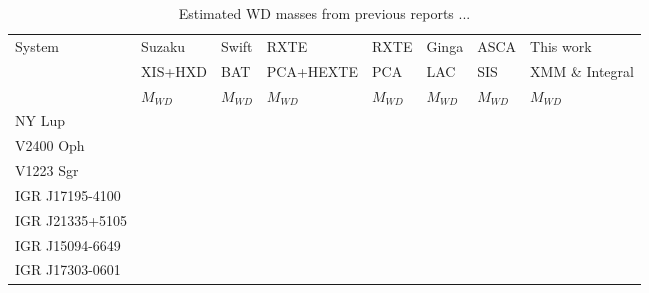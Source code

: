 \documentclass[oneside,a4paper,11pt]{report}
\begin{document}
\begin{table}
\begin{center}
 

\caption{Estimated WD masses from previous reports ...}
\begin{tabular}{llllllll}
\hline
\hline
System & Suzaku & Swift & RXTE & RXTE & Ginga & ASCA& This work  \\
       & XIS+HXD & BAT& PCA+HEXTE & PCA & LAC & SIS & XMM \& Integral                     \\
       & $M_{WD}$ &$M_{WD}$ &$M_{WD} $&$M_{WD}$ &$M_{WD}$ &$M_{WD}$ &$M_{WD}$ \\
\hline
 NY Lup&         &        &          &     &      &         &           \\
 V2400 Oph&         &        &          &     &      &         &           \\
 V1223 Sgr&         &        &          &     &      &         &           \\
 IGR J17195-4100&         &        &          &     &      &         &           \\
 IGR J21335+5105&         &        &          &     &      &         &           \\
 IGR J15094-6649&         &        &          &     &      &         &           \\
 IGR J17303-0601&         &        &          &     &      &         &           \\
\hline

\end{tabular}

\end{center}
\end{table}
\end{document}
